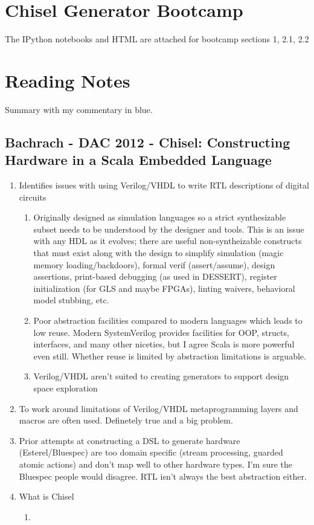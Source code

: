 \section{Chisel Generator Bootcamp}
The IPython notebooks and HTML are attached for bootcamp sections 1, 2.1, 2.2

\section{Reading Notes}
Summary with my commentary {\color{blue}in blue}.

\subsection{Bachrach - DAC 2012 - Chisel: Constructing Hardware in a Scala Embedded Language}

\begin{enumerate}
\item Identifies issues with using Verilog/VHDL to write RTL descriptions of digital circuits
    \begin{enumerate}
        \item Originally designed as simulation languages so a strict synthesizable subset needs to be understood by the designer and tools. {\color{blue} This is an issue with any HDL as it evolves; there are useful non-syntheizable constructs that must exist along with the design to simplify simulation (magic memory loading/backdoors), formal verif (assert/assume), design assertions, print-based debugging (as used in DESSERT), register initialization (for GLS and maybe FPGAs), linting waivers, behavioral model stubbing, etc.}
        \item Poor abstraction facilities compared to modern languages which leads to low reuse. {\color{blue} Modern SystemVerilog provides facilities for OOP, structs, interfaces, and many other niceties, but I agree Scala is more powerful even still. Whether reuse is limited by abstraction limitations is arguable.}
        \item Verilog/VHDL aren't suited to creating generators to support design space exploration
    \end{enumerate}
\item To work around limitations of Verilog/VHDL metaprogramming layers and macros are often used. {\color{blue} Definetely true and a big problem.}
\item Prior attempts at constructing a DSL to generate hardware (Esterel/Bluespec) are too domain specific (stream processing, guarded atomic actions) and don't map well to other hardware types. {\color{blue} I'm sure the Bluespec people would disagree. RTL isn't always the best abstraction either.}
\item What is Chisel
    \begin{enumerate}
        \item 
    \end{enumerate}
\end{enumerate}


